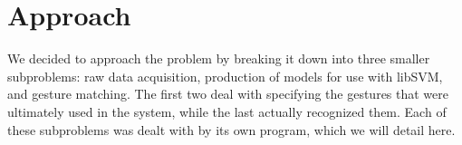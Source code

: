 \documentclass[11pt,conference]{IEEEtran}
\begin{document}
\section{Approach}
We decided to approach the problem by breaking it down into three smaller subproblems: raw data acquisition, production of models for use with libSVM, and gesture matching. The first two deal with specifying the gestures that were ultimately used in the system, while the last actually recognized them. Each of these subproblems was dealt with by its own program, which we will detail here.
\end{document}
